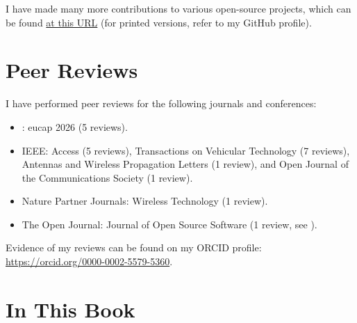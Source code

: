 \begin{refsection}
I have made many more contributions to various open-source projects, which can be found \href{https://github.com/search?q=author%3Ajeertmans+is%3Amerged+-org%3Ajeertmans+-org%3ALELEC210X+-org%3AUCLOUVAIN-CLUB-ELEC+-org%3AADE-Scheduler+-repo%3Aploum%2Flingi2401+&type=pullrequests}{at this URL} (for printed versions, refer to my GitHub profile).

  \clearpage
  \section{Peer Reviews}

  I have performed peer reviews for the following journals and conferences:
  \begin{itemize}
    \item {}: \gls{eucap} 2026 (5 reviews).
    \item IEEE: Access (5 reviews), Transactions on Vehicular Technology (7 reviews), Antennas and Wireless Propagation Letters (1 review), and Open Journal of the Communications Society (1 review).
    \item Nature Partner Journals: Wireless Technology (1 review).
    \item The Open Journal: Journal of Open Source Software (1 review, see ).
  \end{itemize}

  Evidence of my reviews can be found on my ORCID profile: \url{https://orcid.org/0000-0002-5579-5360}.

  \section{In This Book}


\end{refsection}
